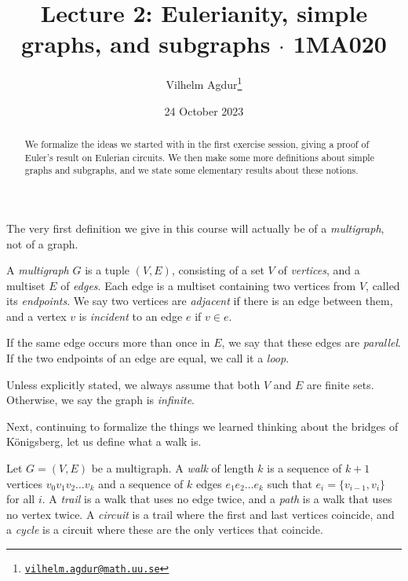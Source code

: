 \documentclass[nobib]{tufte-handout}
\title{Lecture 2: Eulerianity, simple graphs, and subgraphs $\cdot$ 1MA020}
\author[Vilhelm Agdur]{Vilhelm Agdur\thanks{\href{mailto:vilhelm.agdur@math.uu.se}{\nolinkurl{vilhelm.agdur@math.uu.se}}}}
\date{24 October 2023}
\begin{document}
\maketitle%

\begin{abstract}
\noindent
We formalize the ideas we started with in the first exercise session, giving a proof of Euler's result on Eulerian circuits. We then make some more definitions about simple graphs and subgraphs, and we state some elementary results about these notions.
\end{abstract}

The very first definition we give in this course will actually be of a \emph{multigraph}, not of a graph.

\begin{definition}
    A \emph{multigraph} $G$ is a tuple $(V, E)$, consisting of a set $V$ of \emph{vertices}, and a multiset $E$ of \emph{edges}. Each edge is a multiset containing two vertices from $V$, called its \emph{endpoints}. We say two vertices are \emph{adjacent} if there is an edge between them, and a vertex $v$ is \emph{incident} to an edge $e$ if $v \in e$.

    If the same edge occurs more than once in $E$, we say that these edges are \emph{parallel}. If the two endpoints of an edge are equal, we call it a \emph{loop}.

    Unless explicitly stated, we always assume that both $V$ and $E$ are finite sets. Otherwise, we say the graph is \emph{infinite}.
\end{definition}

Next, continuing to formalize the things we learned thinking about the bridges of Königsberg, let us define what a walk is.

\begin{definition}
    Let $G = (V, E)$ be a multigraph. A \emph{walk} of length $k$ is a sequence of $k+1$ vertices $v_0 v_1 v_2\ldots v_k$ and a sequence of $k$ edges $e_1e_2\ldots e_k$ such that $e_i = \{v_{i-1}, v_i\}$ for all $i$. A \emph{trail} is a walk that uses no edge twice, and a \emph{path} is a walk that uses no vertex twice. A \emph{circuit} is a trail where the first and last vertices coincide, and a \emph{cycle} is a circuit where these are the only vertices that coincide.
\end{definition}
\end{document}
